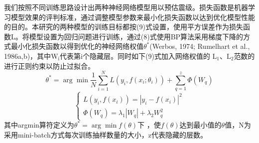 \indent 我们按照不同训练思路设计出两种神经网络模型用以预估震级。损失函数是机器学习模型效果的评判标准，通过调整模型参数来最小化损失函数以达到优化模型性能的目的。本研究的两种模型的训练目标都按(9)式设置，使用平方误差作为损失函数L。将模型设置为回归问题进行训练，通过(8)式使用BP算法采用梯度下降的方式最小化损失函数以得到优化的神经网络权值$\theta^{*}$(Werbos, 1974; Rumelhart et al., 1986a,b)，其中$\mathrm{W}_{\mathrm{i}}$代表第i个隐藏层。同时如下(9)式加入网络权值的
$\mathrm{L}_{1}$、$\mathrm{L}_{2}$范数的进行正则约束以防止过拟合。\\
\begin{equation}
\theta^{*}=\arg \min \frac{1}{N} \sum_{i=1}^{N} L\left(y_{i}, f\left(x_{i} ; \theta_{i}\right)\right)+\sum_{q=1}^{z} \Phi\left(W_{q}\right)
\end{equation}
\begin{equation}
\left\{\begin{array}{c}{L\left(y_{i}, f\left(x_{i}\right)\right)=\left|y_{i}-f\left(x_{i}\right)\right|^{2}} \\ {\Phi\left(W_{q}\right)=\lambda_{1}\left|W_{q}\right|+\lambda_{2} W_{q}^{2}}\end{array}\right.
\end{equation}
其中arg⁡min算符定义为$\theta^{*}=\arg \min f(\theta)$下
，使$f(\theta)$达到最小值的$\theta$值，N为采用mini-batch方式每次训练抽样数量的大小，z代表隐藏的层数。\\
